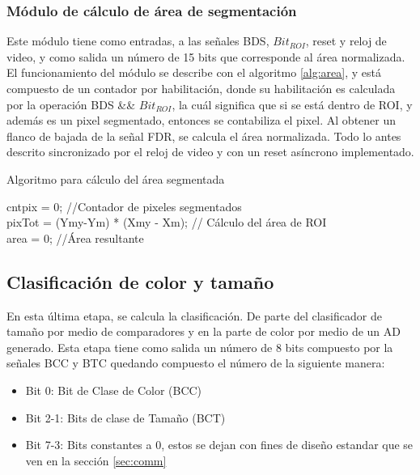 \documentclass[twoside,spanish,ESP,MSc]{plantillaLabUPV}
\theoremstyle{definition}
\begin{document}
\subsubsection{Módulo de cálculo de área de segmentación} \label{sec:areasgm}

Este módulo tiene como entradas, a las señales BDS, $Bit_{ROI}$, reset y reloj de video, y como salida un número de 15 bits que corresponde al área normalizada. El funcionamiento del módulo se describe con el algoritmo \ref{alg:area}, y está compuesto de un contador por habilitación, donde su habilitación es calculada por la operación BDS \&\& $Bit_{ROI}$, la cuál significa que si se está dentro de ROI, y además es un pixel segmentado, entonces se contabiliza el pixel. Al obtener un flanco de bajada de la señal FDR, se calcula el área normalizada. Todo lo antes descrito sincronizado por el reloj de video y con un reset asíncrono implementado.

\begin{algorithm} %
	\caption{Algoritmo para cálculo del área segmentada}
	\label{alg:area}
	\SetAlgoLined
	
	cntpix = 0; //Contador de pixeles segmentados \\
	pixTot = (Ymy-Ym) * (Xmy - Xm); // Cálculo del área de ROI\\
	area = 0; //Área resultante
	
\end{algorithm}



\subsection{Clasificación de color y tamaño}
En esta última etapa, se calcula la clasificación. De parte del clasificador de tamaño por medio de comparadores y en la parte de color por medio de un AD generado. Esta etapa tiene como salida un número de 8 bits compuesto por la señales BCC y BTC %
quedando compuesto el número de la siguiente manera:

\begin{itemize}[noitemsep]
	\item Bit 0: Bit de Clase de Color (BCC)
	\item Bit 2-1: Bits de clase de Tamaño (BCT)
	\item Bit 7-3: Bits constantes a 0, estos se dejan con fines de diseño estandar que se ven en la sección \ref{sec:comm}
\end{itemize}
\end{document}
